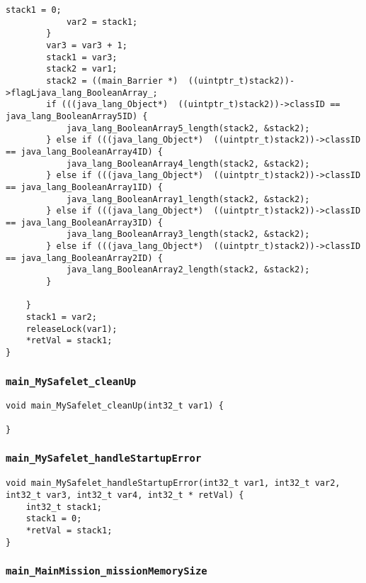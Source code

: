 \begin{landscape}
\begin{multicols}{2}
\begin{lstlisting}[firstnumber=472]
			stack1 = 0;
			var2 = stack1;
		}
		var3 = var3 + 1;
		stack1 = var3;
		stack2 = var1;
		stack2 = ((main_Barrier *)  ((uintptr_t)stack2))->flagLjava_lang_BooleanArray_;
		if (((java_lang_Object*)  ((uintptr_t)stack2))->classID == java_lang_BooleanArray5ID) {
			java_lang_BooleanArray5_length(stack2, &stack2);
		} else if (((java_lang_Object*)  ((uintptr_t)stack2))->classID == java_lang_BooleanArray4ID) {
			java_lang_BooleanArray4_length(stack2, &stack2);
		} else if (((java_lang_Object*)  ((uintptr_t)stack2))->classID == java_lang_BooleanArray1ID) {
			java_lang_BooleanArray1_length(stack2, &stack2);
		} else if (((java_lang_Object*)  ((uintptr_t)stack2))->classID == java_lang_BooleanArray3ID) {
			java_lang_BooleanArray3_length(stack2, &stack2);
		} else if (((java_lang_Object*)  ((uintptr_t)stack2))->classID == java_lang_BooleanArray2ID) {
			java_lang_BooleanArray2_length(stack2, &stack2);
		}

	}
	stack1 = var2;
	releaseLock(var1);
	*retVal = stack1;
}
\end{lstlisting}

\subsubsection{\texttt{main\_MySafelet\_cleanUp}}

\begin{lstlisting}[firstnumber=658]
void main_MySafelet_cleanUp(int32_t var1) {
	
}
\end{lstlisting}

\subsubsection{\texttt{main\_MySafelet\_handleStartupError}}

\begin{lstlisting}[firstnumber=1183]
void main_MySafelet_handleStartupError(int32_t var1, int32_t var2, int32_t var3, int32_t var4, int32_t * retVal) {
	int32_t stack1;
	stack1 = 0;
	*retVal = stack1;
}
\end{lstlisting}

\subsubsection{\texttt{main\_MainMission\_missionMemorySize}}


\end{multicols}
\end{landscape}
